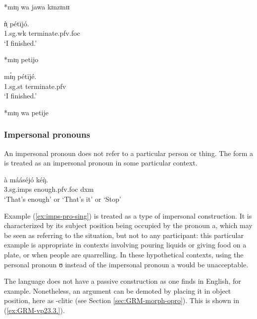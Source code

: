 \begin{exe}
\begin{exe}
\begin{exe}
{\begin{exe}
\begin{exe}
\begin{exe}
\begin{exe}
\begin{exe}
\begin{exe}
\begin{multicols}{2}
   \ex\label{ex:GRM-out-STR-NEG-buy}
  *mɪŋ wa  jawa   kɪnzɪnɪɪ 
  
     \ex\label{ex:GRM-out-STR-FOC-finish-g}
\gll ǹ̩   pétījó.\\
 {\sc 1.sg.wk}  {terminate.{\sc pfv.foc}}\\
\glt  `I finished.' 


   \ex\label{ex:GRM-out-STR-FOC-finish}
  *mɪŋ   petijo

   \ex\label{ex:}
\gll mɪ́ŋ   pétījé.\\
  {\sc  1.sg.st} {terminate.{\sc pfv}}\\
\glt   `I finished.'  

   \ex\label{ex:GRM-out-STR-NEG-finish}
  *mɪŋ   wa petije
 
   
  \z 
     \end{multicols}
 \z
  
  
 \subsubsection{Impersonal pronouns}
 \label{sec:GRM-impers-pro}

An impersonal pronoun does  not refer to a particular person or thing. The form
{\sls a} is treated as an impersonal pronoun  in some
particular context.

      
\begin{exe} 
\ex\label{ex:imps-pro-sing}
\gll à mááséjó kéŋ̀.\\
  {\sc 3.sg.imps}  enough.{\sc pfv.foc} {\sc dxm}\\
\glt `That's enough' or `That's it' or `Stop'
\z

Example (\ref{ex:imps-pro-sing}) is treated as a type of impersonal construction.  It is 
characterized by its  subject position being  occupied by the pronoun {\sls a}, which may be seen 
as 
referring to the situation,  but not to any participant: this particular example is appropriate in 
contexts involving pouring  liquids or giving food on a plate, or when people are quarrelling. In 
these hypothetical contexts, using the personal pronoun {\sls ʊ} instead of  the  impersonal 
pronoun 
 {\sls a} would be unacceptable.  

The language does not have a passive construction as one finds in English, for example. 
Nonetheless, 
an argument  can be demoted  by placing it in object position, here as -clitic  (see Section \ref{sec:GRM-morph-opro}). This is shown in (\ref{ex:GRM-vp23.3.}).



\end{exe}
\end{exe}
\end{exe}
\end{exe}
\end{exe}
\end{exe}
\end{exe}}
\end{exe}
\end{exe}
\end{exe}
